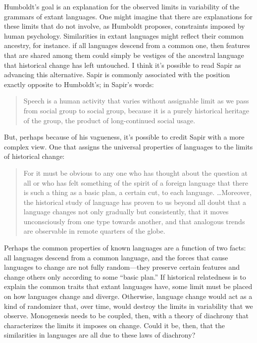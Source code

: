 Humboldt's goal is an explanation for the observed limits in variability of the grammars of extant languages. One might imagine that there are explanations for these limits that do not involve, as Humboldt proposes, constraints imposed by human psychology. Similarities in extant languages might reflect their common ancestry, for instance. if all languages descend from a common one, then features that are shared among them could simply be vestiges of the ancestral language that historical change has left untouched. I think it's possible to read Sapir as advancing this alternative. Sapir is commonly associated with the position exactly opposite to Humboldt's; in Sapir's words:
     \begin{quote}
     	Speech is a human activity that varies without assignable limit as we pass from social group to social group, because it is a purely historical heritage of the group, the product of long-continued social usage.\\ 
                            \hspace*{2in} \citep[p. 4]{Sapir:1921}
          \end{quote}
But, perhaps because of his vagueness, it's possible to credit Sapir with a more complex view. One that assigns the universal properties of languages to the limits of historical change:
     \begin{quote}
     For it must be obvious to any one who has thought about the question at all or who has felt something of the spirit of a foreign language that there is such a thing as a basic plan, a certain cut, to each language. \ldots Moreover, the historical study of language has proven to us beyond all doubt that a language changes not only gradually but consistently, that it moves unconsciously from one type towards another, and that analogous trends are observable in remote quarters of the globe.\\ 
                                \hspace*{2in} \citep[pp. 120-121]{Sapir:1921}
          \end{quote}
Perhaps the common properties of known languages are a function of two facts: all languages descend from a common language, and the forces that cause languages to change are not fully random---they preserve certain features and change others only according to some ``basic plan.'' If historical relatedness is to explain the common traits that extant languages have, some limit must be placed on how languages change and diverge. Otherwise, language change would act as a kind of randomizer that, over time, would destroy the limits in variability that we observe. Monogenesis needs to be coupled, then, with a theory of diachrony that characterizes the limits it imposes on change. Could it be, then, that the similarities in languages are all due to these laws of diachrony?

